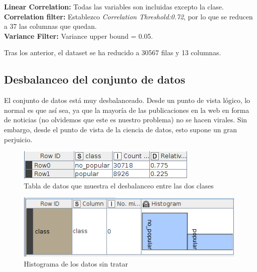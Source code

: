 \textbf{Linear Correlation:} Todas las variables son incluidas excepto la clase.\\
\textbf{Correlation filter:} Establezco \textit{Correlation Threshold:0.72}, por lo que se reducen a 37 las columnas que quedan. \\
\textbf{Variance Filter:} Variance upper bound = 0.05.

Tras los anterior, el dataset se ha reducido a 30567 filas y 13 columnas.



\subsection{Desbalanceo del conjunto de datos}

El conjunto de datos está muy desbalanceado. Desde un punto de vista lógico, lo normal es que así sea, ya que la mayoría de las publicaciones en la web en forma de noticias (no olvidemos que este es nuestro problema) no se hacen virales. Sin embargo, desde el punto de vista de la ciencia de datos, esto supone un gran perjuicio.

\begin{figure}[H] %
	\centering
	\includegraphics[scale=0.6]{unbalanced-data.png}  %
	\caption{Tabla de datos que muestra el desbalanceo entre las dos clases} 
	\label{fig:unb-data}
\end{figure}

\begin{figure}[H] %
	\centering
	\includegraphics[scale=0.6]{hist-unb-data.png}  %
	\caption{Histograma de los datos sin tratar} 
	\label{fig:hist-unb-data}
\end{figure}

